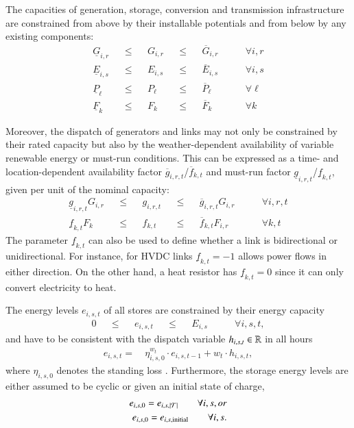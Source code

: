 The capacities of generation, storage, conversion and transmission
infrastructure are constrained from above by their installable potentials and
from below by any existing components:
\begin{align}
  \underline{G}_{i,r}  &  & \leq &  & G_{i,r}  &  & \leq &  & \overline{G}_{i,r}  & \qquad\forall i, r \label{eq:genlimit} \\
  \underline{E}_{i,s}  &  & \leq &  & E_{i,s}  &  & \leq &  & \overline{E}_{i,s}  & \qquad\forall i, s \\
  \underline{P}_{\ell} &  & \leq &  & P_{\ell} &  & \leq &  & \overline{P}_{\ell} & \qquad\forall \ell \\
  \underline{F}_{k} &  & \leq &  & F_{k} &  & \leq &  & \overline{F}_{k} & \qquad\forall k
\end{align}

Moreover, the dispatch of generators and links may not only be constrained by their rated capacity but also by the weather-dependent availability of
variable renewable energy or must-run conditions.
This can be expressed as a time- and location-dependent availability
factor $\overline{g}_{i,r,t}$/$\overline{f}_{k,t}$  and must-run factor $\underline{g}_{i,r,t}$/$\underline{f}_{k,t}$, given per unit of the nominal capacity:
\begin{align}
    \underline{g}_{i,r,t}  G_{i,r} &  & \leq &  & g_{i,r,t} &  & \leq &  & \overline{g}_{i,r,t} G_{i,r} & \qquad\forall i, r, t \\
    \underline{f}_{k,t}  F_{k} &  & \leq &  & f_{k,t} &  & \leq &  & \overline{f}_{k,t} F_{i,r} & \qquad\forall k, t
\end{align}
The parameter $\underline{f}_{k,t}$ can also be used to define whether a link is
bidirectional or unidirectional. For instance, for HVDC links
$\underline{f}_{k,t}=-1$ allows power flows in either direction. On the other
hand, a heat resistor has $\underline{f}_{k,t}=0$ since it can only convert
electricity to heat.

The energy levels $e_{i,s,t}$ of all stores are constrained by their energy capacity
\begin{align}
  0 &  & \leq &  & e_{i,s,t} &  & \leq &  & E_{i,s} & \qquad\forall i, s, t,
\end{align}
and have to be consistent with the dispatch variable $h_{i,s,t}\in\mathbb{R}$ in all
hours
\begin{align}
  e_{i,s,t} =\: & \eta_{i,s,0}^{w_t} \cdot e_{i,s,t-1} + w_t \cdot h_{i,s,t}, \label{eq:stoe}
\end{align}
where $\eta_{i,s,0}$ denotes the standing loss . Furthermore, the storage energy
levels are either assumed to be cyclic or given an initial state of charge,
\begin{align}
  e_{i,s,0} = e_{i,s,\left|\mathcal{T}\right|} \qquad\forall i, s, or\\
  e_{i,s,0} = e_{i,s,\text{initial}} \qquad\forall i, s.
\end{align}

